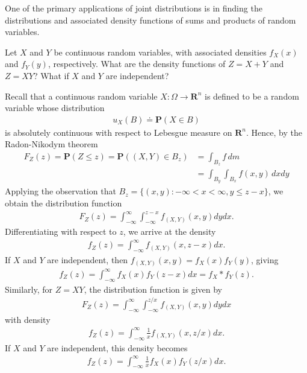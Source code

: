 \begin{definition}
	One of the primary applications of joint distributions is in finding the
	distributions and associated density functions of sums and products of 
	random
	variables.
	\begin{example}
		Let $X$ and $Y$ be continuous random variables, with associated 
		densities
		$f_X(x)$ and $f_Y(y)$, respectively. What are the density functions of
		$Z = X+Y$ and $Z = XY$? What if $X$ and $Y$ are independent?
	\end{example}
	Recall that a continuous random variable $X: \Omega \to \mathbf{R}^n$
	is defined to be a random variable whose distribution
	\begin{align*}
		u_X(B) \doteq \mathbf{P}(X \in B)
	\end{align*}
	is absolutely continuous with respect to Lebesgue measure on $\mathbf{R}^n$. 
	Hence, by
	the Radon-Nikodym theorem
	\begin{align*}
		F_Z(z) = \mathbf{P}(Z \le z) = \mathbf{P}((X,Y) \in B_z) 
		& = \int_{B_z} f \, dm
		\\
		& = \int_{B_y} \int_{B_x} f(x,y) \, dx dy
	\end{align*}
	Applying the observation that $B_z
	= \{(x,y):
	-\infty < x < \infty, y \le z-x \}$, we obtain the distribution function 
	\begin{align*}
		F_Z(z) = \int_{-\infty}^{\infty} \int_{-\infty}^{z-x} f_{(X,Y)}(x,y) dy 
		dx.
	\end{align*}
	Differentiating with respect to $z$, we arrive
	at the density
	\begin{align*}
		f_Z(z) = \int_{-\infty}^{\infty} f_{(X,Y)}(x,z-x) dx.
	\end{align*}
	If $X$ and $Y$ are independent, then $f_{(X,Y)}(x, y) = f_X(x) f_Y(y)$, 
	giving
	\begin{align*}
		f_Z(z) = \int_{-\infty}^{\infty} f_X(x) f_Y(z-x) dx = f_X * f_Y(z).
	\end{align*}
	Similarly, for $Z = XY$,  the distribution
	function is given by
	\begin{align*}
		F_Z(z) = \int_{-\infty}^{\infty} \int_{-\infty}^{z/x} f_{(X,Y)}(x,y) dy 
		dx
	\end{align*}
	with density
	\begin{align*}
		f_Z(z) = \int_{-\infty}^{\infty} \frac{1}{x} f_{(X,Y)}(x,z/x) dx.
	\end{align*}
	If $X$ and $Y$ are independent, this density becomes
	\begin{align*}
		f_Z(z) = \int_{-\infty}^{\infty} \frac{1}{x} f_X(x) f_Y(z/x) dx.
	\end{align*}

\end{definition}
